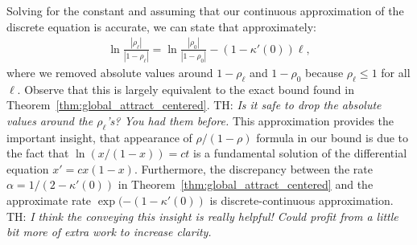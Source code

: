 \documentclass[twoside]{article}
\newcommand{\E}{\mathbb{E}}
\theoremstyle{definition}
\newcommand{\thomas}[1]{{\color{blue}TH:  \textit{#1}}}
\begin{document}
Solving for the constant and assuming that our continuous approximation of the discrete equation is accurate, we can state that approximately:
\begin{align*}
\ln \frac{|\rho_\ell|}{|1-\rho_\ell|} =  \ln \frac{|\rho_0|}{|1-\rho_0|} -(1-\kappa'(0))\ell,
\end{align*}
where we removed absolute values around $1-\rho_\ell$ and $1-\rho_0$ because $\rho_\ell\le 1$ for all $\ell.$
Observe that this is largely equivalent to the exact bound found in Theorem~\ref{thm:global_attract_centered}. \thomas{Is it safe to drop the absolute values around the $\rho_\ell$'s? You had them before.} 
This approximation provides the important insight, that appearance of $\rho/(1-\rho)$ formula in our bound is due to the fact that $\ln(x/(1-x)) = c t $ is a fundamental solution of the differential equation $x' = c x(1-x).$ Furthermore, the discrepancy between the rate $\alpha = 1/(2-\kappa'(0))$ in Theorem~\ref{thm:global_attract_centered} and the approximate rate $\exp(-(1-\kappa'(0))$ is discrete-continuous approximation.  \thomas{I think the conveying this insight is really helpful! Could profit from a little bit more of extra work to increase clarity.}

\end{document}
